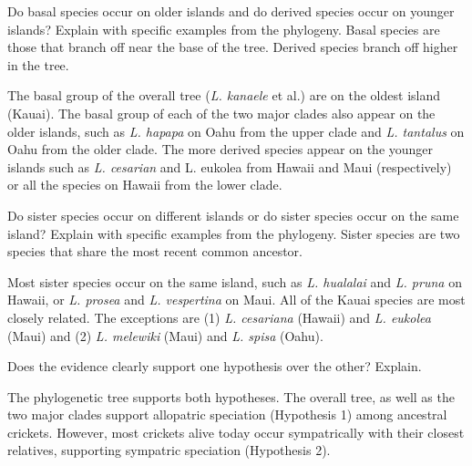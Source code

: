 \documentclass[11pt, addpoints]{exam}
\begin{document}
\begin{questions}

\question[3]
Do basal species occur on older islands and do derived species occur
on younger islands? Explain with specific examples from the phylogeny. Basal species are those that branch off near the base of the tree. Derived species branch off higher in the tree.

\begin{minipage}[t][1.35in]{\textwidth}%
\begin{solution}
The basal group of the overall tree (\textit{L. kanaele} et al.) are on the oldest island (Kauai). The basal group of each of the two major clades also appear on the older islands, such as \textit{L. hapapa} on Oahu from the upper clade and \textit{L. tantalus} on Oahu from the older clade. The more derived species appear on the younger islands such as \textit{L. cesarian} and {L. eukolea} from Hawaii and Maui (respectively) or all the species on Hawaii from the lower clade.
\end{solution} 
\end{minipage}

\question[3]
Do sister species occur on different islands or do sister species
occur on the same island? Explain with specific examples from the
phylogeny. Sister species are two species that share the most recent common ancestor.

\begin{minipage}[t][1.35in]{\textwidth}%
\begin{solution}
Most sister species occur on the same island, such as \textit{L. hualalai} and \textit{L. pruna} on Hawaii, or \textit{L. prosea} and \textit{L. vespertina} on Maui. All of the Kauai species are most closely related. The exceptions are (1) \textit{L. cesariana} (Hawaii) and \textit{L. eukolea} (Maui) and (2) \textit{L. melewiki} (Maui) and \textit{L. spisa} (Oahu).
\end{solution}
\end{minipage}

\question[3]
Does the evidence clearly support one hypothesis over the other?
Explain.

\begin{minipage}[t][1.35in]{\textwidth}%
\begin{solution}
The phylogenetic tree supports both hypotheses. The overall tree, as well as the two major clades support allopatric speciation (Hypothesis 1) among ancestral crickets. However, most crickets alive today occur sympatrically with their closest relatives, supporting sympatric speciation (Hypothesis 2).
\end{solution}
\end{minipage}


\end{questions}
\end{document}
